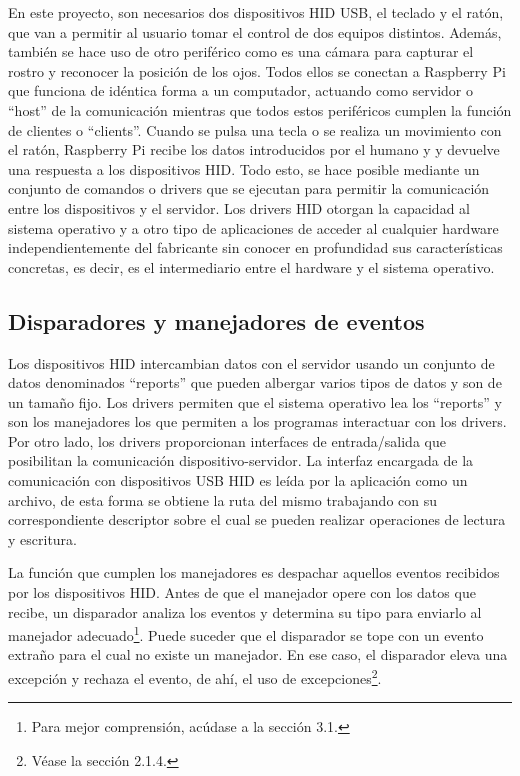 En este proyecto, son necesarios dos dispositivos HID USB, el teclado y el ratón, que van a permitir al usuario tomar el control de dos equipos distintos. Además, también se hace uso de otro periférico como es una cámara para capturar el rostro y reconocer la posición de los ojos. Todos ellos se conectan a Raspberry Pi que funciona de idéntica forma a un computador, actuando como servidor o ``host'' de la comunicación mientras que todos estos periféricos cumplen la función de clientes o ``clients''. Cuando se pulsa una tecla o se realiza un movimiento con el ratón, Raspberry Pi recibe los datos introducidos por el humano y y devuelve una respuesta a los dispositivos HID. Todo esto, se hace posible mediante un conjunto de comandos o drivers que se ejecutan para permitir la comunicación entre los dispositivos y el servidor. Los drivers HID otorgan la capacidad al sistema operativo y a otro tipo de aplicaciones de acceder al cualquier hardware independientemente del fabricante sin conocer en profundidad sus características concretas, es decir, es el intermediario entre el hardware y el sistema operativo.



\subsection{Disparadores y manejadores de eventos} \label{s2_1_2}

Los dispositivos HID intercambian datos con el servidor usando un conjunto de datos denominados ``reports'' que pueden albergar varios tipos de datos y son de un tamaño fijo. Los drivers permiten que el sistema operativo lea los ``reports'' y son los manejadores los que permiten a los programas interactuar con los drivers. Por otro lado, los drivers proporcionan interfaces de entrada/salida que posibilitan la comunicación dispositivo-servidor. La interfaz encargada de la comunicación con dispositivos USB HID es leída por la aplicación como un archivo, de esta forma se obtiene la ruta del mismo trabajando con su correspondiente descriptor sobre el cual se pueden realizar operaciones de lectura y escritura. 

La función que cumplen los manejadores es despachar aquellos eventos recibidos por los dispositivos HID. Antes de que el manejador opere con los datos que recibe, un disparador analiza los eventos y determina su tipo para enviarlo al manejador adecuado\footnote{Para mejor comprensión, acúdase a la sección 3.1.}. Puede suceder que el disparador se tope con un evento extraño para el cual no existe un manejador. En ese caso, el disparador eleva una excepción y rechaza el evento, de ahí, el uso de excepciones\footnote{Véase la sección 2.1.4.}.

